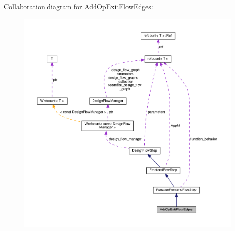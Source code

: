 Collaboration diagram for Add\+Op\+Exit\+Flow\+Edges\+:
\nopagebreak
\begin{figure}[H]
\begin{center}
\leavevmode
\includegraphics[width=350pt]{d5/da7/classAddOpExitFlowEdges__coll__graph}
\end{center}
\end{figure}

